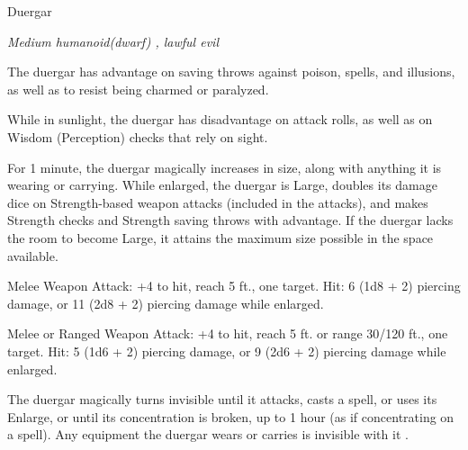 \begin{monsterbox}{Duergar}
\begin{hangingpar}
\textit{Medium humanoid(dwarf) , lawful evil}
\end{hangingpar}
\dndline%
\basics[%
armorclass = 16,
hitpoints = 4d8 + 8,
speed = {25 ft.}
]
\dndline%
\stats[%
STR = \stat{14},
DEX = \stat{11},
CON = \stat{14},
INT = \stat{11},
WIS = \stat{10},
CHA = \stat{9}
]
\dndline%
\details[%
skills={},
damageimmunities={},
savingthrows={},
conditionimmunities={},
damageresistances={poison},
damagevulnerabilities={},
senses={darkvision 120 ft., passive Perception 10},
languages={Dwarvish, Undercommon},
challenge=1
]
\dndline%
\begin{monsteraction}
The duergar has advantage on saving throws against poison, spells, and illusions, as well as to resist being charmed or paralyzed.
\end{monsteraction}
\begin{monsteraction}
While in sunlight, the duergar has disadvantage on attack rolls, as well as on Wisdom (Perception) checks that rely on sight.
\end{monsteraction}
\begin{monsteraction}
For 1 minute, the duergar magically increases in size, along with anything it is wearing or carrying. While enlarged, the duergar is Large, doubles its damage dice on Strength-based weapon attacks (included in the attacks), and makes Strength checks and Strength saving throws with advantage. If the duergar lacks the room to become Large, it attains the maximum size possible in the space available.
\end{monsteraction}
\begin{monsteraction}
Melee Weapon Attack: +4 to hit, reach 5 ft., one target. Hit: 6 (1d8 + 2) piercing damage, or 11 (2d8 + 2) piercing damage while enlarged.
\end{monsteraction}
\begin{monsteraction}[Javelin]
Melee or Ranged Weapon Attack: +4 to hit, reach 5 ft. or range 30/120 ft., one target. Hit: 5 (1d6 + 2) piercing damage, or 9 (2d6 + 2) piercing damage while enlarged.
\end{monsteraction}
\begin{monsteraction}
The duergar magically turns invisible until it attacks, casts a spell, or uses its Enlarge, or until its concentration is broken, up to 1 hour (as if concentrating on a spell). Any equipment the duergar wears or carries is invisible with it .
\end{monsteraction}
\end{monsterbox}